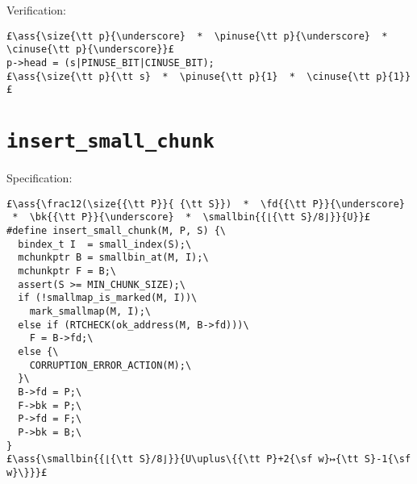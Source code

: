 \documentclass[svgnames,10pt,twoside]{report}
\makeatletter
\newcommand{\ml}[2][t]{\mbox{\mdseries\begin{tabular}[#1]{@{}L@{}}#2\end{tabular}}}
\newcommand{\ass}[1]{\ensuremath{{\color{blue}\left\{\ml[c]{#1}\right\}}}}
\makeatother
\begin{document}
\noindent Verification:
\begin{lstlisting}
£\ass{\size{\tt p}{\underscore}  *  \pinuse{\tt p}{\underscore}  *  \cinuse{\tt p}{\underscore}}£
p->head = (s|PINUSE_BIT|CINUSE_BIT);
£\ass{\size{\tt p}{\tt s}  *  \pinuse{\tt p}{1}  *  \cinuse{\tt p}{1}}£
\end{lstlisting}


\section{\tt insert\_small\_chunk}

Specification:
\begin{lstlisting}
£\ass{\frac12(\size{{\tt P}}{ {\tt S}})  *  \fd{{\tt P}}{\underscore}  *  \bk{{\tt P}}{\underscore}  *  \smallbin{{⌊{\tt S}/8⌋}}{U}}£
#define insert_small_chunk(M, P, S) {\
  bindex_t I  = small_index(S);\
  mchunkptr B = smallbin_at(M, I);\
  mchunkptr F = B;\
  assert(S >= MIN_CHUNK_SIZE);\
  if (!smallmap_is_marked(M, I))\
    mark_smallmap(M, I);\
  else if (RTCHECK(ok_address(M, B->fd)))\
    F = B->fd;\
  else {\
    CORRUPTION_ERROR_ACTION(M);\
  }\
  B->fd = P;\
  F->bk = P;\
  P->fd = F;\
  P->bk = B;\
}
£\ass{\smallbin{{⌊{\tt S}/8⌋}}{U\uplus\{{\tt P}+2{\sf w}↦{\tt S}-1{\sf w}\}}}£
\end{lstlisting}
\end{document}
